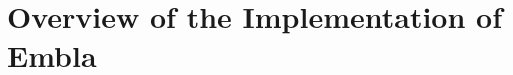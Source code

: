 %

\section{Overview of the Implementation of Embla}



\newcommand{\backlink}[3]
{\begin{picture}(#1,#2)
\put(0,0){\line(1,0){#1}}
\put(#1,0){\line(0,1){#2}}
\put(#1,#2){\vector(-1,0){#3}}
\end{picture}}

\newcommand{\rwblock}
{\begin{picture}(100,40)(-40,0)
\put(0,25){\line(4,3){20}}
\put(0,15){\line(4,-3){20}}
\put(-40,25){\line(1,0){40}}
\put(-40,15){\line(1,0){40}}
\put(20,0){\framebox(40,40){\ }}
\put(20,30){\line(1,0){40}}
\put(20,30){\makebox(40,10){Last write}}
\put(20,20){\makebox(40,10){Last reads}}
\put(20,5){\makebox(40,10){\vdots}}
\end{picture}}
